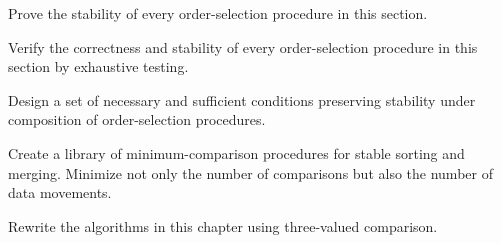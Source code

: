 \begin{exercise}
	Prove the stability of every order-selection procedure in this
	section.
\end{exercise}

\begin{exercise}
	Verify the correctness and stability of every order-selection
	procedure in this section by exhaustive testing.
\end{exercise}

\begin{project}
	Design a set of necessary and sufficient conditions preserving
	stability under composition of order-selection procedures.
\end{project}

\begin{project}
	Create a library of minimum-comparison procedures for stable
	sorting and merging. Minimize not only the number of comparisons
	but also the number of data movements.
\end{project}

\begin{exercise}
	Rewrite the algorithms in this chapter using three-valued
	comparison.
\end{exercise}
